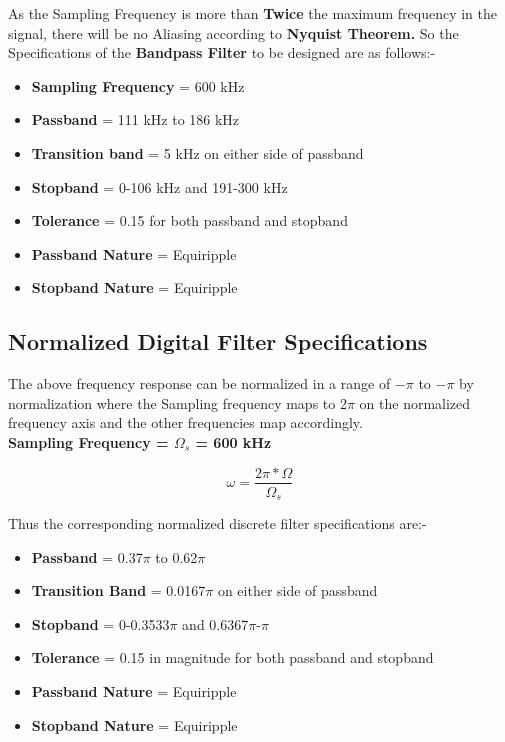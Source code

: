 \documentclass[12pt]{article}
\begin{document}
As the Sampling Frequency is more than \textbf{Twice} the maximum frequency in the signal, there will be no Aliasing according to \textbf{Nyquist Theorem.}
\noindent So the Specifications of the \textbf{Bandpass Filter} to be designed are as follows:-

\begin{itemize}
    \item \textbf{Sampling Frequency} = 600 kHz
    \item \textbf{Passband} = 111 kHz to 186 kHz
    \item \textbf{Transition band} = 5 kHz on either side of passband
    \item \textbf{Stopband} = 0-106 kHz and 191-300 kHz
    \item \textbf{Tolerance} = 0.15 for both passband and stopband
    \item \textbf{Passband Nature} = Equiripple
    \item \textbf{Stopband Nature} = Equiripple
\end{itemize}
\newpage

\subsection{Normalized Digital Filter Specifications}
The above frequency response can be normalized in a range of $-\pi$ to $-\pi$ by normalization where the Sampling frequency maps to 2$\pi$ on the normalized frequency axis and the other frequencies map accordingly.\\
\textbf{Sampling Frequency = $\Omega_{s}$ = 600 kHz}

\[\omega = \frac{2\pi*\Omega}{\Omega_{s}}\]

Thus the corresponding normalized discrete filter specifications are:-
\begin{itemize}
    \item \textbf{Passband} = 0.37$\pi$ to 0.62$\pi$
    \item \textbf{Transition Band} = 0.0167$\pi$ on either side of passband
    \item \textbf{Stopband} = 0-0.3533$\pi$ and 0.6367$\pi$-$\pi$
    \item\textbf{Tolerance} = 0.15 in magnitude for both passband and stopband
    \item \textbf{Passband Nature} = Equiripple
    \item \textbf{Stopband Nature} = Equiripple
\end{itemize}
\end{document}
